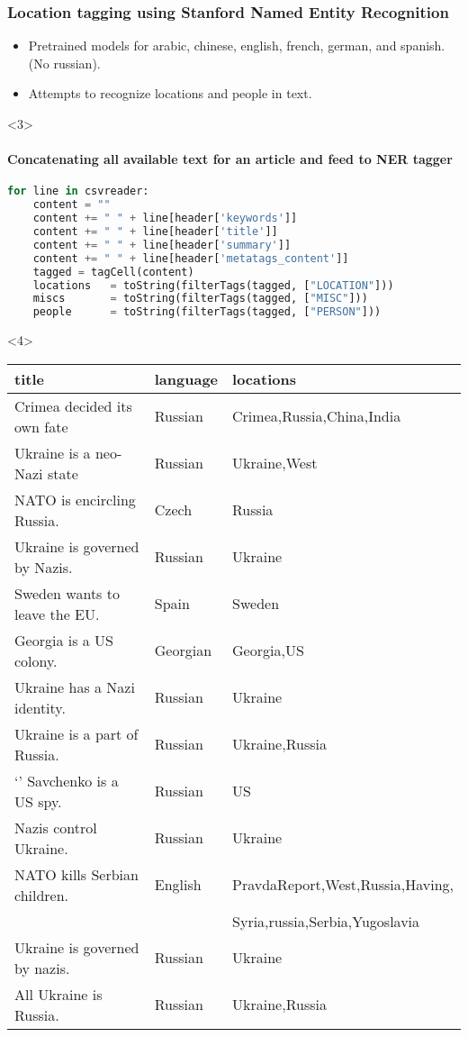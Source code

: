 \documentclass{beamer}
\begin{document}
\begin{frame}[fragile]
    \frametitle{Location tagging using Stanford Named Entity Recognition}
    \begin{itemize}
        \item<1-2> Pretrained models for arabic, chinese, english, french, german, and spanish. (No russian). 
        \item<2-2> Attempts to recognize locations and people in text.
    \end{itemize}
    \begin{onlyenv}<3>
        \framesubtitle<3>{Concatenating all available text for an article and feed to NER tagger}
        \begin{lstlisting}[language=Python]
for line in csvreader:                                
    content = ""                                    
    content += " " + line[header['keywords']]
    content += " " + line[header['title']]
    content += " " + line[header['summary']]
    content += " " + line[header['metatags_content']]
    tagged = tagCell(content)          
    locations   = toString(filterTags(tagged, ["LOCATION"]))
    miscs       = toString(filterTags(tagged, ["MISC"]))
    people      = toString(filterTags(tagged, ["PERSON"]))
        \end{lstlisting}
    \end{onlyenv}
    \begin{onlyenv}<4>
    {\footnotesize
    \begin{tabular}{l | l | l }
        {\bf title } & {\bf language } & {\bf locations }\\ \hline
        Crimea decided its own fate & Russian & Crimea,Russia,China,India \\
        Ukraine is a neo-Nazi state & Russian & Ukraine,West \\
        NATO is encircling Russia. & Czech & Russia \\
        Ukraine is governed by Nazis. & Russian & Ukraine \\
        Sweden wants to leave the EU. & Spain & Sweden \\
        Georgia is a US colony. & Georgian & Georgia,US \\
        Ukraine has a Nazi identity. & Russian & Ukraine \\
        Ukraine is a part of Russia. & Russian & Ukraine,Russia \\`'
        Savchenko is a US spy. & Russian & US \\
        Nazis control Ukraine. & Russian & Ukraine \\
        NATO kills Serbian children. & English & PravdaReport,West,Russia,Having,\\
                                     &         & Syria,russia,Serbia,Yugoslavia \\
        Ukraine is governed by nazis. & Russian & Ukraine \\
        All Ukraine is Russia. & Russian & Ukraine,Russia \\
    \end{tabular}
    }
    \end{onlyenv}


\end{frame}
\end{document}
